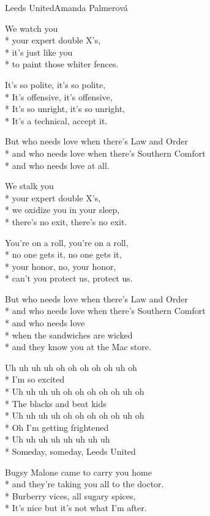 \documentclass[10.5pt]{book}
\begin{document}
\fi
\iffalse
\begin{poem}{Leeds United}{Amanda Palmerová}

\settowidth{\versewidth}{He’s free to tread and lift the sheets}

We watch you\\*
your expert double X's,\\*
it's just like you\\*
to paint those whiter fences.

It's so polite, it's so polite,\\*
It's offensive, it's offensive,\\*
It's so unright, it's so unright,\\*
It's a technical, accept it.

But who needs love when there's Law and Order\\*
and who needs love when there's Southern Comfort\\*
and who needs love at all.

We stalk you\\*
your expert double X's,\\*
we oxidize you in your sleep,\\*
there's no exit, there's no exit.

You're on a roll, you're on a roll,\\*
no one gets it, no one gets it,\\*
your honor, no, your honor,\\*
can't you protect us, protect us.

But who needs love when there's Law and Order\\*
and who needs love when there's Southern Comfort\\*
and who needs love\\*
when the sandwiches are wicked\\*
and they know you at the Mac store.

Uh uh uh uh oh oh oh oh oh uh oh\\*
I'm so excited\\*
Uh uh uh uh oh oh oh oh oh uh oh\\*
The blacks and beat kids\\*
Uh uh uh uh oh oh oh oh oh uh oh\\*
Oh I'm getting frightened\\*
Uh uh uh uh uh uh uh uh\\*
Someday, someday, Leeds United

Bugsy Malone came to carry you home\\*
and they're taking you all to the doctor.\\*
Burberry vices, all sugary spices,\\*
It's nice but it's not what I'm after.


\end{poem}
\end{document}

